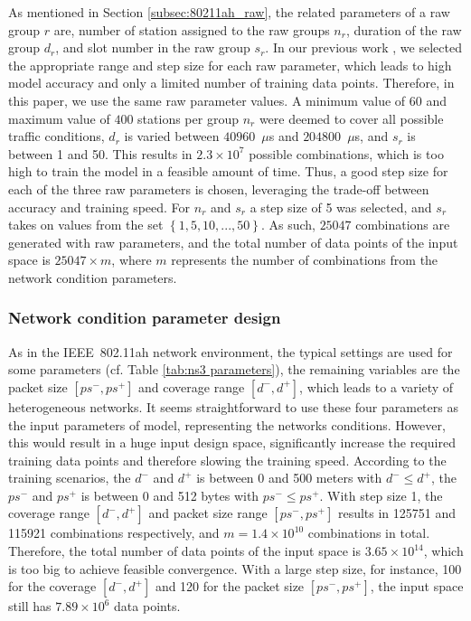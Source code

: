 As mentioned in Section \ref{subsec:80211ah_raw}, the related parameters of a \gls{raw} group $r$ are, number of station assigned to the \gls{raw} groups $n_r$, duration of the \gls{raw} group $d_r$, and slot number in the \gls{raw} group $s_r$. In our previous work \cite{wowmom2018}, we selected the appropriate range and step size for each \gls{raw} parameter, which leads to high model accuracy and only a limited number of training data points. Therefore, in this paper, we use the same \gls{raw} parameter values. A minimum value of $60$ and maximum value of $400$ stations per group $n_r$ were deemed to cover all possible traffic conditions, $d_r$ is varied between $40960$~$\mu$s and $204800$~$\mu$s, and  $s_r$ is between 1 and 50. This results in $2.3 \times 10^7$ possible combinations, which is too high to train the model in a feasible amount of time. Thus, a good step
size for each of the three \gls{raw} parameters is chosen, leveraging the trade-off between accuracy and training speed.
For $n_r$ and $s_r$ a step size of 5 was selected, and $s_r$ takes on values from the set $\left\{1, 5, 10, ..., 50\right\}$. As such, $25047$ combinations are generated with \gls{raw} parameters, and the total number of data points of the input space is $25047 \times m$, where $m$ represents the number of combinations from the network condition parameters.

\subsubsection{Network condition parameter design \label{subsec:network_para_design}}

As in the IEEE~802.11ah network environment, the typical settings are used for  some parameters (cf. Table \ref{tab:ns3 parameters}), the remaining variables are the  packet size  $[ps^-, ps^+]$ and coverage range $[d^-, d^+]$, which leads to a variety of heterogeneous networks. It seems straightforward to use these four parameters as the input parameters of model, representing the networks conditions. However, this would result in a huge input design space, significantly increase the required training data points and therefore slowing the training speed. According to the training scenarios, the $d^-$ and $d^+$ is between 0 and 500 meters with $d^- \leq d^+$, the $ps^-$ and $ps^+$ is between 0 and 512 bytes with $ps^- \leq ps^+$. With step size 1, the coverage range $[d^-, d^+]$ and packet size range $[ps^-, ps^+]$ results in 125751 and 115921 combinations respectively, and $m = 1.4 \times 10^{10} $ combinations in total. Therefore, the total number of data points of the input space is $3.65 \times  10^{14}$, which is too big to achieve feasible convergence. With a large step size, for instance, 100 for  the coverage $[d^-, d^+]$ and 120 for the packet size $[ps^-, ps^+]$, the input space still has $7.89 \times  10^{6}$ data points.


